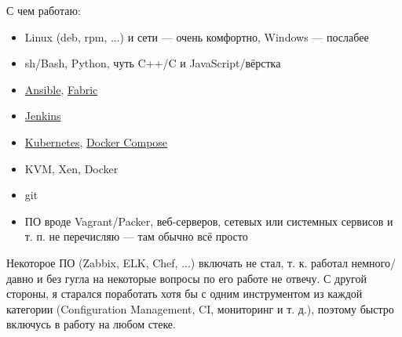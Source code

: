 \documentclass[10pt, a4paper]{article}
\begin{document}
С чем работаю:
\begin{itemize}
  \item Linux (deb, rpm, ...) и сети — очень комфортно, Windows — послабее
  \item sh/Bash, Python, чуть C++/C и JavaScript/вёрстка
  \item \href{https://github.com/bititanb/ansible-taskmngr}{Ansible}, \href{https://bitbucket.org/bititanb/ivd-fabric/src}{Fabric}
  \item \href{https://github.com/bititanb/taskmngr/blob/master/Jenkinsfile}{Jenkins}
  \item \href{https://github.com/bititanb/ansible-taskmngr/tree/master/roles/taskmngr-kubernetes/templates}{Kubernetes}, \href{https://github.com/bititanb/taskmngr/blob/master/docker-compose.yml}{Docker Compose}
  \item KVM, Xen, Docker
  \item git
  \item ПО вроде Vagrant/Packer, веб-серверов, сетевых или системных сервисов и т. п. не перечисляю — там обычно всё просто
\end{itemize}

Некоторое ПО (Zabbix, ELK, Chef, ...) включать не стал, т. к. работал немного/давно и без гугла на некоторые вопросы по его работе не отвечу. С другой стороны, я старался поработать хотя бы с одним инструментом из каждой категории (Configuration Management, CI, мониторинг и т. д.), поэтому быстро включусь в работу на любом стеке.





\end{document}

